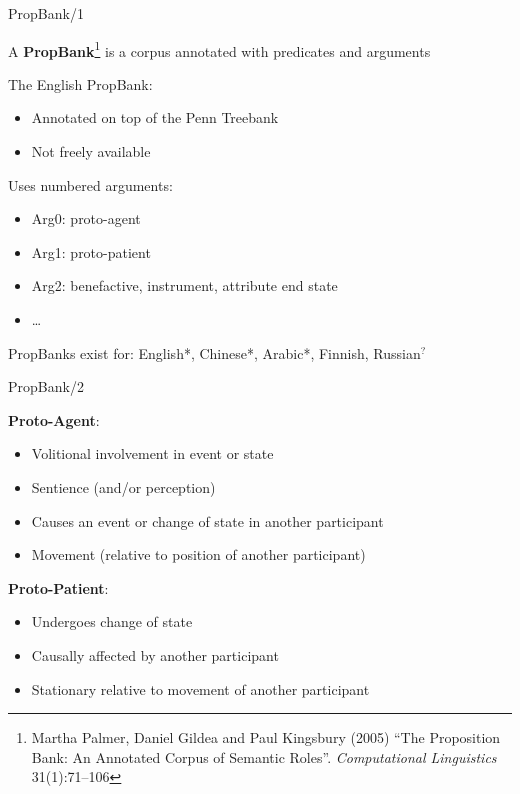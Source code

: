 \documentclass[10pt, compress]{beamer}
\begin{document}
\begin{frame}{PropBank/1}

A \textbf{PropBank}\footnote{Martha Palmer, Daniel Gildea and Paul Kingsbury (2005) ``The Proposition Bank: An Annotated Corpus of Semantic Roles''. \emph{Computational Linguistics} 31(1):71--106} is a corpus annotated with predicates and arguments

The English PropBank:
\begin{itemize}
  \item Annotated on top of the Penn Treebank
  \item Not freely available 
\end{itemize}

Uses numbered arguments:
  \begin{itemize}
    \item Arg0: {\sc proto-agent}
    \item Arg1: {\sc proto-patient}
    \item Arg2: {\sc benefactive}, {\sc instrument}, {\sc attribute} {\sc end state}
    \item \ldots
  \end{itemize}  

PropBanks exist for: English*, Chinese*, Arabic*, Finnish, Russian$^?$

\end{frame}

\begin{frame}{PropBank/2}
  
\textbf{Proto-Agent}:
\begin{itemize}
 \item Volitional involvement in event or state
 \item Sentience (and/or perception)
 \item Causes an event or change of state in another participant 
 \item Movement (relative to position of another participant)
\end{itemize}

\textbf{Proto-Patient}:
\begin{itemize}
 \item Undergoes change of state
 \item Causally affected by another participant 
 \item Stationary relative to movement of another participant
\end{itemize}

\end{frame}
\end{document}
